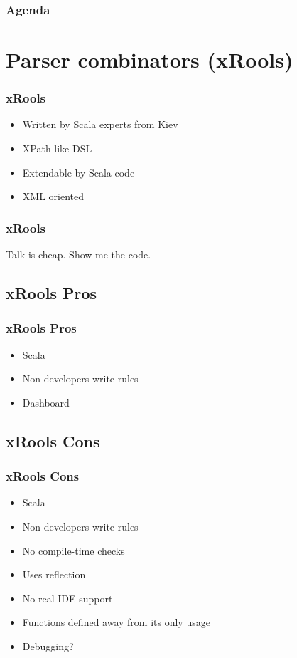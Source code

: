 \documentclass[14pt]{beamer}
\begin{document}
\frame%
{\frametitle{Agenda}
  \tableofcontents[1]
}

\section{Parser combinators (xRools)}
\frame
{\frametitle{xRools}
\begin{itemize}
  \item Written by Scala experts from Kiev
  \item XPath like DSL
  \item Extendable by Scala code
  \item XML oriented
\end{itemize}
}

\frame
{\frametitle{xRools}
\begin{center}
  \large Talk is cheap. Show me the code.
\end{center}
}

\subsection{xRools Pros}
\frame
{\frametitle{xRools Pros}
\begin{itemize}
    \item<1-> Scala
    \item<2-> Non-developers write rules
    \item<3-> Dashboard 
\end{itemize}
}

\subsection{xRools Cons}
\frame
{\frametitle{xRools Cons}
\begin{itemize}
    \item<1-> Scala
    \item<2-> Non-developers write rules
    \item<3-> No compile-time checks
    \item<4-> Uses reflection
    \item<5-> No real IDE support
    \item<6-> Functions defined away from its only usage
    \item<7-> Debugging?
\end{itemize}
}
\end{document}
